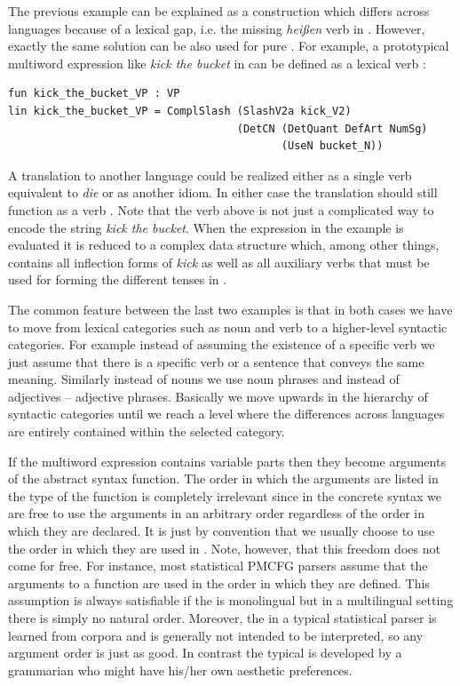 \documentclass[output=paper]{langsci/langscibook}
\begin{document}
The previous example can be explained as a construction which differs
across languages because of a lexical gap, i.e. the missing \textit{hei{\ss}en}
verb in . However, exactly the same solution can be also used for
pure . For example, a prototypical multiword expression like
\textit{kick the bucket} in  can be defined as a lexical verb :
\begin{verbatim}
fun kick_the_bucket_VP : VP
lin kick_the_bucket_VP = ComplSlash (SlashV2a kick_V2) 
                                    (DetCN (DetQuant DefArt NumSg)
                                           (UseN bucket_N))
\end{verbatim}
A translation to another language could be realized either as a single
verb equivalent to \textit{die} or as another idiom. In either case
the translation should still function as a verb . Note that the
verb  above is not just a complicated way to encode the string 
\textit{kick the bucket}. When the expression in the example is evaluated
it is reduced to a complex data structure which, among other things, contains
all inflection forms of \textit{kick} as well as all auxiliary verbs that
must be used for forming the different tenses in .

The common feature between the last two examples is that in both
cases we have to move from lexical categories such as noun and verb
to a higher-level syntactic categories. For example instead of assuming
the existence of a specific verb we just assume that there is a specific
verb  or a sentence that conveys the same meaning. Similarly
instead of nouns we use noun phrases and instead of adjectives -- adjective phrases.
Basically we move upwards in the hierarchy of syntactic categories until
we reach a level where the differences across languages are entirely
contained within the selected category. 

If the multiword expression
contains variable parts then they become arguments of the abstract
syntax function. The order in which the arguments are listed in the
type of the function is completely irrelevant since in the concrete
syntax we are free to use the arguments in an arbitrary order regardless 
of the order in which they are declared. It is just by convention that
we usually choose to use the order in which they are used in .
Note, however, that this freedom does not come for free. 
For instance, most statistical PMCFG parsers assume that 
the arguments to a function are used in the order in which they are defined.
This assumption is always satisfiable if the  is monolingual but in 
a multilingual setting there is simply no natural order. Moreover,
the  in a typical statistical parser is learned from corpora
and is generally not intended to be interpreted, so any argument order
is just as good. In contrast the typical  
is developed by a grammarian who might have his/her own aesthetic
preferences.
\end{document}
